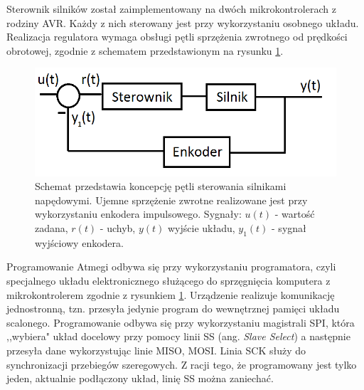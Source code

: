 Sterownik silników został zaimplementowany na dwóch mikrokontrolerach z rodziny AVR. Każdy z nich sterowany jest przy wykorzystaniu osobnego układu. Realizacja regulatora wymaga obsługi pętli sprzężenia zwrotnego od prędkości obrotowej, zgodnie z schematem przedstawionym na rysunku \ref{schem_ster}. 

  \begin{figure}[H]
    \begin{center}
      \includegraphics[scale=0.45]{imgs/sterowanie.png}
 	\caption[Schemat pętli sterowania silnikami.]{\small{Schemat przedstawia koncepcję pętli sterowania silnikami napędowymi. Ujemne sprzężenie zwrotne realizowane jest przy wykorzystaniu enkodera impulsowego. Sygnały: $u(t)$ - wartość zadana, $r(t)$ - uchyb, $y(t)$ wyjście układu, $y_1(t)$ - sygnał wyjściowy enkodera.}}
	\label{schem_ster}
    \end{center}
  \end{figure}  
  
Programowanie Atmegi odbywa się przy wykorzystaniu programatora, czyli specjalnego układu elektronicznego służącego do sprzęgnięcia komputera z mikrokontrolerem zgodnie z rysunkiem \ref{schem_ster}. Urządzenie realizuje komunikację jednostronną, tzn. przesyła jedynie program do wewnętrznej pamięci układu scalonego.  Programowanie odbywa się przy wykorzystaniu magistrali SPI, która ,,wybiera" układ docelowy przy pomocy linii SS (ang. \textit{Slave Select}) a następnie przesyła dane wykorzystując linie MISO, MOSI. Linia SCK służy do synchronizacji przebiegów szeregowych. Z racji tego, że programowany jest tylko jeden, aktualnie podłączony układ, linię SS można zaniechać.


